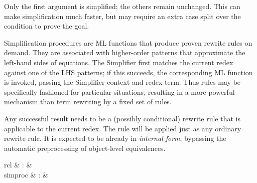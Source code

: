 \begin{isabellebody}
\begin{isamarkuptext}
  Only the first argument is simplified; the others remain unchanged.
  This can make simplification much faster, but may require an extra
  case split over the condition  to prove the goal.%
\end{isamarkuptext}%
\isamarkuptrue%
%
\isamarkuptrue%
%
\begin{isamarkuptext}%
Simplification procedures are ML functions that produce proven
  rewrite rules on demand.  They are associated with higher-order
  patterns that approximate the left-hand sides of equations.  The
  Simplifier first matches the current redex against one of the LHS
  patterns; if this succeeds, the corresponding ML function is
  invoked, passing the Simplifier context and redex term.  Thus rules
  may be specifically fashioned for particular situations, resulting
  in a more powerful mechanism than term rewriting by a fixed set of
  rules.

  Any successful result needs to be a (possibly conditional) rewrite
  rule  that is applicable to the current redex.  The
  rule will be applied just as any ordinary rewrite rule.  It is
  expected to be already in \emph{internal form}, bypassing the
  automatic preprocessing of object-level equivalences.

  \begin{matharray}{rcl}
    \hypertarget{command.simproc-setup}{\hyperlink{command.simproc-setup}{\mbox{}}} & : &  \\
    simproc & : &  \\
  \end{matharray}


\end{isamarkuptext}
\end{isabellebody}
